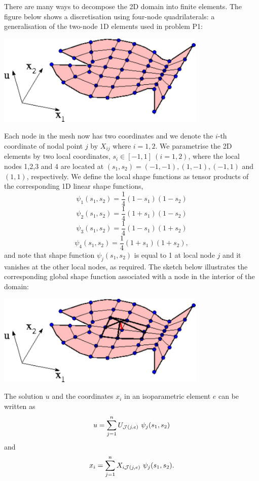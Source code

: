 There are many ways to decompose the 2D domain into finite elements. The figure below shows a discretisation using four-\/node quadrilaterals\+: a generalisation of the two-\/node 1D elements used in problem P1\+:  
\begin{DoxyImage}
\includegraphics[width=0.75\textwidth]{fish_domain_with_mesh}
\end{DoxyImage}
 Each node in the mesh now has two coordinates and we denote the $i$-\/th coordinate of nodal point $j$ by $ X_{ij}$ where $ i=1,2 $. We parametrise the 2D elements by two local coordinates, $ s_i \in [-1,1] \ (i=1,2)$, where the local nodes 1,2,3 and 4 are located at $(s_1,s_2)=(-1,-1), (1,-1), (-1,1)$ and $(1,1)$, respectively. We define the local shape functions as tensor products of the corresponding 1D linear shape functions, \[ \psi_1(s_1,s_2) = \frac{1}{4}(1-s_1)(1-s_2) \] \[ \psi_2(s_1,s_2) = \frac{1}{4}(1+s_1)(1-s_2) \] \[ \psi_3(s_1,s_2) = \frac{1}{4}(1-s_1)(1+s_2) \] \[ \psi_4(s_1,s_2) = \frac{1}{4}(1+s_1)(1+s_2), \] and note that shape function $ \psi_j(s_1,s_2)$ is equal to 1 at local node $j$ and it vanishes at the other local nodes, as required. The sketch below illustrates the corresponding global shape function associated with a node in the interior of the domain\+:  
\begin{DoxyImage}
\includegraphics[width=0.75\textwidth]{fish_domain_with_shape_fct}
\end{DoxyImage}
 The solution $u$ and the coordinates $x_i$ in an isoparametric element $e$ can be written as \[ u = \sum_{j=1}^n U_{{\cal J}(j,e)} \ \psi_j(s_1,s_2) \] and \[ x_i = \sum_{j=1}^n X_{i{\cal J}(j,e)} \ \psi_j(s_1,s_2). \]

